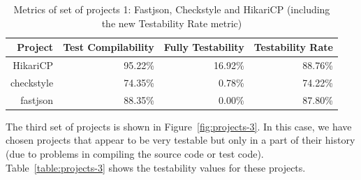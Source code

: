 \begin{table}[h!]
    \centering
    \begin{tabular}{|r|r|r|r|}
        \hline
        \textbf{Project} & \textbf{Test Compilability} & \textbf{Fully Testability} & \textbf{Testability Rate} \\ \hline
        HikariCP         & 95.22\%                      & 16.92\%                      & 88.76\%                     \\ \hline
        checkstyle       & 74.35\%                      & 0.78\%                       & 74.22\%                     \\ \hline
        fastjson         & 88.35\%                      & 0.00\%                       & 87.80\%                     \\ \hline
        \end{tabular}
    \caption{Metrics of set of projects 1: Fastjson, Checkstyle and HikariCP (including the new Testability Rate metric)}
    \label{table:projects-2-with-testability-rate}
\end{table}


The third set of projects is shown in Figure~\ref{fig:projects-3}. 
In this case, we have chosen projects that appear to be very testable but only in a part of their history (due to problems in compiling the source code or test code).
Table~\ref{table:projects-3} shows the testability values for these projects. 

